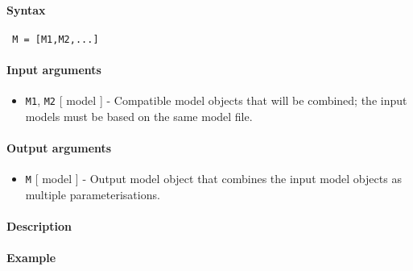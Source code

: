 


	\paragraph{Syntax}
 
 \begin{verbatim}
 M = [M1,M2,...]
 \end{verbatim}
 
 \paragraph{Input arguments}
 
 \begin{itemize}
 \item
   \texttt{M1}, \texttt{M2} {[} model {]} - Compatible model objects that
   will be combined; the input models must be based on the same model
   file.
 \end{itemize}
 
 \paragraph{Output arguments}
 
 \begin{itemize}
 \item
   \texttt{M} {[} model {]} - Output model object that combines the input
   model objects as multiple parameterisations.
 \end{itemize}
 
 \paragraph{Description}
 
 \paragraph{Example}


